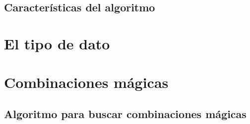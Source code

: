\documentclass{article}
\begin{document}
\subsection{Características del algoritmo}

\section{El tipo de dato}

\section{Combinaciones mágicas}
\subsection{Algoritmo para buscar combinaciones mágicas}
\end{document}
